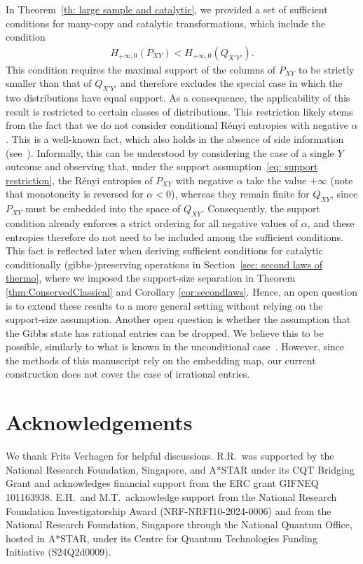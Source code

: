 \documentclass[aps,pra,11pt,onecolumn,nofootinbib,tightenlines]{revtex4-2}
\theoremstyle{definition}
\begin{document}
In Theorem~\ref{th: large sample and catalytic}, we provided a set of sufficient conditions for many-copy and catalytic transformations, which include the condition
\begin{align}
\label{eq: support restriction}
    H_{+\infty,0}(P_{XY}) < H_{+\infty,0}(Q_{X'Y'}) .
\end{align}
This condition requires the maximal support of the columns of $P_{XY}$ to be strictly smaller than that of $Q_{X'Y'}$ and therefore excludes the special case in which the two distributions have equal support.
As a consequence, the applicability of this result is restricted to certain classes of distributions.
 This restriction likely stems from the fact that we do not consider conditional R\'enyi entropies with negative $\alpha$. This is a well-known fact, which also holds in the absence of side information (see~\cite{Jensen_Kjaerulf_2019,farooq2024matrix}).
 Informally, this can be understood by considering the case of a single $Y$ outcome and observing that, under the support assumption~\eqref{eq: support restriction}, the R\'enyi entropies of $P_{XY}$ with negative $\alpha$ take the value $+\infty$ (note that monotoncity is reversed for $\alpha<0$), whereas they remain finite for $Q_{XY}$, since $P_{XY}$ must be embedded into the space of $Q_{XY}$.
Consequently, the support condition already enforces a strict ordering for all negative values of $\alpha$, and these entropies therefore do not need to be included among the sufficient conditions.
This fact is reflected later when deriving sufficient conditions for catalytic conditionally (gibbs-)preserving operations in Section~\ref{sec: second laws of thermo}, where we imposed the support-size separation in Theorem \ref{thm:ConservedClassical} and Corollary \ref{cor:secondlaws}.
Hence, an open question is to extend these results to a more general setting without relying on the support-size assumption.
Another open question is whether the assumption that the Gibbs state has rational entries can be dropped. We believe this to be possible, similarly to what is known in the unconditional case~\cite{farooq2024matrix}. However, since the methods of this manuscript rely on the embedding map, our current construction does not cover the case of irrational entries.


\section{Acknowledgements}
We thank Frits Verhagen for helpful discussions. R.R.\ was supported by the National Research Foundation, Singapore, and A*STAR under its CQT Bridging Grant and acknowledges financial support from the ERC grant GIFNEQ 101163938. E.H.\ and M.T.\ acknowledge support from the National Research Foundation Investigatorship Award (NRF-NRFI10-2024-0006) and from the National Research Foundation, Singapore through the National Quantum Office, hosted in A*STAR, under its Centre for Quantum Technologies Funding Initiative (S24Q2d0009).
\end{document}
